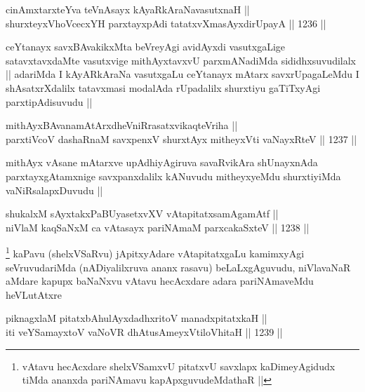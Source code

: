 \begin{shl}
cinAmxtarxteYva teVnAsayx kAyaRkAraNavasutxnaH || \\
shurxteyxVhoVcecxYH parxtayxpAdi tatatxvXmasAyxdirUpayA ||  1236 ||  
\end{shl}

\begin{artha}
ceYtanayx savxBAvakikxMta beVreyAgi avidAyxdi vasutxgaLige satavxtavxdaMte vasutxvige mithAyxtavxvU parxmANadiMda sididhxsuvudilalx || adariMda I kAyARkAraNa vasutxgaLu ceYtanayx mAtarx savxrUpagaLeMdu I shAsatxrXdalilx tatavxmasi modalAda rUpadalilx shurxtiyu gaTiTxyAgi parxtipAdisuvudu ||
\end{artha}


\begin{shl}
mithAyxBAvanamAtArxdheVniRrasatxvikaqteVriha || \\
parxtiVcoV dashaRnaM savxpenxV shurxtAyx mitheyxVti vaNayxRteV ||  1237 ||  
\end{shl}

\begin{artha}
mithAyx vAsane mAtarxve upAdhiyAgiruva savaRvikAra shUnayxnAda parxtayxgAtamxnige savxpanxdalilx kANuvudu mitheyxyeMdu shurxtiyiMda vaNiRsalapxDuvudu ||
\end{artha}


\begin{shl}
shukalxM sAyxtakxPaBUyasetxvXV vAtapitatxsamAgamAtf || \\
niVlaM kaqSaNxM ca vAtasayx pariNAmaM parxcakaSxteV ||  1238 ||  
\end{shl}

\begin{artha}
\footnote{vAtavu hecAcxdare shelxVSamxvU pitatxvU savxlapx kaDimeyAgidudx tiMda ananxda pariNAmavu kapApxguvudeMdathaR ||}
kaPavu (shelxVSaRvu) jApitxyAdare vAtapitatxgaLu kamimxyAgi seVruvudariMda (nADiyalilxruva ananx rasavu) beLaLxgAguvudu, niVlavaNaR aMdare kapupx baNaNxvu vAtavu hecAcxdare adara pariNAmaveMdu heVLutAtxre
\end{artha}

\begin{shl}
piknagxlaM pitatxbAhulAyxdadhxritoV manadxpitatxkaH || \\
iti veYSamayxtoV vaNoVR dhAtusAmeyxV\s tiloVhitaH ||  1239 ||  
\end{shl}

